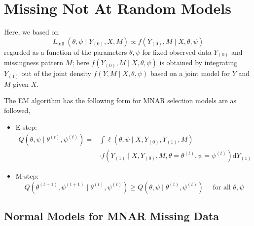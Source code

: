\section{Missing Not At Random Models}

Here, we based on
\begin{equation}
    L_{\text {full }}\left(\theta, \psi \mid Y_{(0)}, X, M\right) \propto f\left(Y_{(0)}, M \mid X, \theta, \psi\right)
\end{equation}
regarded as a function of the parameters $\theta, \psi$ for fixed observed data $Y_{(0)}$ and missingness pattern $M$; here $f\left(Y_{(0)}, M \mid X, \theta, \psi\right)$ is obtained by integrating $Y_{(1)}$ out of the joint density $f(Y, M \mid X, \theta, \psi)$ based on a joint model for $Y$ and $M$ given $X$.

The EM algorithm has the following form for MNAR selection models are as followed,
\begin{itemize}
    \item E-step:
          \begin{equation}
              \begin{aligned}
                  Q\left(\theta, \psi \mid \theta^{(t)}, \psi^{(t)}\right)= & \int \ell\left(\theta, \psi \mid X, Y_{(0)}, Y_{(1)}, M\right)                                         \\
                                                                            & \cdot f\left(Y_{(1)}\mid X, Y_{(0)}, M, \theta=\theta^{(t)}, \psi=\psi^{(t)}\right) \mathrm{d} Y_{(1)}
              \end{aligned}
          \end{equation}
    \item M-step:
          \begin{equation}
              Q\left(\theta^{(t+1)}, \psi^{(t+1)} \mid \theta^{(t)}, \psi^{(t)}\right) \geq Q\left(\theta, \psi \mid \theta^{(t)}, \psi^{(t)}\right) \quad \text { for all } \theta, \psi
          \end{equation}
\end{itemize}

\subsection{Normal Models for MNAR Missing Data}

